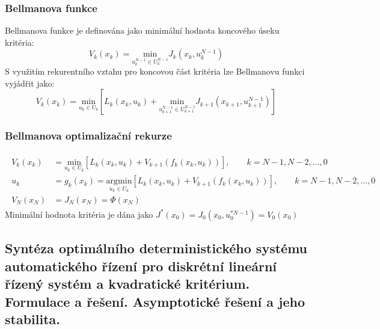 \subsubsection*{Bellmanova funkce}
Bellmanova funkce je definována jako minimální hodnota koncového úseku kritéria:
\begin{equation}
V_k(x_k) = \underset{u_k^{N-1} \in U_k^{N-1}}{\mathrm{min}} J_k(x_k, u_k^{N-1})
\end{equation}
S využitím rekurentního vztahu pro koncovou část kritéria lze Bellmanovu funkci vyjádřit jako:
\begin{equation}
V_k(x_k) = \underset{u_k \in U_k}{\mathrm{min}} \left[ L_k(x_k, u_k) + \underset{u_{k+1}^{N-1} \in U_{k+1}^{N-1}}{\mathrm{min}} J_{k+1}(x_{k+1}, u_{k+1}^{N-1}) \right]
\end{equation}

\subsubsection*{Bellmanova optimalizační rekurze}
\begin{align*}
\begin{split}
V_k(x_k) &= \underset{u_k \in U_k}{\mathrm{min}} \left[ L_k(x_k, u_k) + V_{k+1}(f_k(x_k,u_k)) \right], \qquad k= N-1, N-2, ..., 0 \\
u_k &= g_k(x_k) = \underset{u_k \in U_k}{\mathrm{argmin}} \left[ L_k(x_k, u_k) + V_{k+1}(f_k(x_k,u_k)) \right], \qquad k= N-1, N-2, ..., 0 \\
V_N(x_N) &= J_N(x_N) = \Phi(x_N)
\end{split}
\end{align*}
Minimální hodnota kritéria je dána jako $ J^*(x_0) = J_0(x_0,u_0^{* N-1}) = V_0(x_0) $

\subsection{Syntéza optimálního deterministického systému automatického řízení pro diskrétní lineární řízený systém a kvadratické kritérium. Formulace a řešení. Asymptotické řešení a jeho stabilita.}

